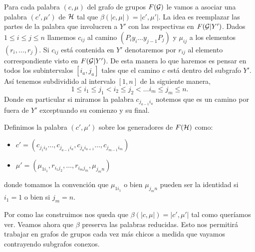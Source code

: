 \documentclass[tesis.tex]{subfiles}
\newcommand{\cG}{ {\cal G} }
\newcommand{\cH}{ {\cal H} }
\begin{document}
Para cada palabra $(c, \mu)$ del grafo de grupos $F(\cG)$ le vamos a asociar una palabra $(c', \mu')$ de $\cH$ tal que $\beta (|c,\mu|) = |c',\mu'|$.
La idea es reemplazar las partes de la palabra que involucren a $Y'$ con las respectivas en $F(\cG | Y')$.
Dados $ 1 \le i \le j \le n$ llamemos $c_{ij}$ al camino $(P_iy_i \dots y_{j-1}P_j)$ y $\mu_{ij}$ a los elementos $(r_i, \dots, r_j)$.
Si $c_{ij}$ está contenida en $Y'$ denotaremos por $r_{ij}$ al elemento correspondiente visto en $F(\cG | Y')$.
De esta manera lo que haremos es pensar en todos los subintervalos $[i_a,j_a]$ tales que el camino $c$ está dentro del subgrafo $Y'$.
Así tenemos subdividido al intervalo $[1,n]$ de la siguiente manera,
\[
	1\le i_1 \le j_1 < i_2 \le j_2 < \dots i_m \le j_m \le n.
\]
Donde en particular si miramos la palabra $c_{j_{a-1}i_a}$ notemos que es un camino por fuera de $Y'$ exceptuando su comienzo y su final.

Definimos la palabra $(c', \mu')$ sobre los generadores de $F(\cH)$ como:
\begin{itemize}
	\item $c' = (c_{j_1i_2} \dots, c_{j_{a-1}i_a},c_{j_{a}i_{a+1}} \dots, c_{j_{m-1}i_{m}})$
	\item $\mu' = (\mu_{1i_1}, r_{i_1j_2}, \dots, r_{i_mj_m}, \mu_{j_m n}   )$
\end{itemize}
donde tomamos la convención que $\mu_{1i_1}$ o bien $\mu_{j_m n}$ pueden ser la identidad si $i_1=1$ o bien si $j_m = n$.




Por como las construimos nos queda que $\beta(|c,\mu|) = |c',\mu'|$ tal como queríamos ver.
Veamos ahora que $\beta$ preserva las palabras reducidas. 
Esto nos permitirá trabajar en grafos de grupos cada vez más chicos a medida que vayamos contrayendo subgrafos conexos.
\end{document}
